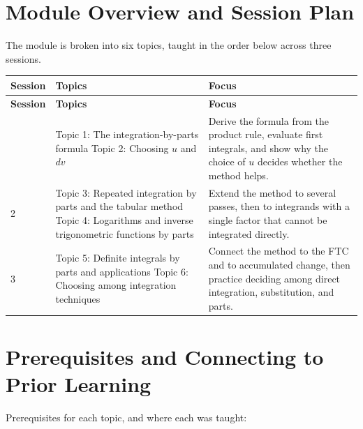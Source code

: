\documentclass[11pt]{article}
\begin{document}
\section{Module Overview and Session Plan}

The module is broken into six topics, taught in the order below across three sessions.

\begin{longtable}{p{1.8cm}p{5.9cm}p{7.2cm}}
\toprule
\textbf{Session} & \textbf{Topics} & \textbf{Focus} \\
\midrule
\endfirsthead
\toprule
\textbf{Session} & \textbf{Topics} & \textbf{Focus} \\
\midrule
\endhead
\bottomrule
\endfoot
1 & Topic 1: The integration-by-parts formula \newline Topic 2: Choosing $u$ and $dv$ & Derive the formula from the product rule, evaluate first integrals, and show why the choice of $u$ decides whether the method helps. \\
2 & Topic 3: Repeated integration by parts and the tabular method \newline Topic 4: Logarithms and inverse trigonometric functions by parts & Extend the method to several passes, then to integrands with a single factor that cannot be integrated directly. \\
3 & Topic 5: Definite integrals by parts and applications \newline Topic 6: Choosing among integration techniques & Connect the method to the FTC and to accumulated change, then practice deciding among direct integration, substitution, and parts. \\
\end{longtable}

\section{Prerequisites and Connecting to Prior Learning}

Prerequisites for each topic, and where each was taught:
\end{document}
